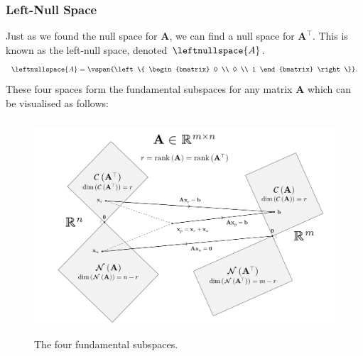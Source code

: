 \documentclass{article}
\begin{document}
\subsubsection{Left-Null Space}
Just as we found the null space for \(\symbf{A}\), we can find a null
space for \(\symbf{A}^\top\). This is known as the left-null space,
denoted \(\leftnullspace{A}\).
\begin{equation*}
    \leftnullspace{A} =
    \vspan{\left\{
        \begin{bmatrix}
            0 \\
            0 \\
            1
        \end{bmatrix}
        \right\}}.
\end{equation*}
These four spaces form the fundamental subspaces for any matrix \(\symbf{A}\)
which can be visualised as follows:
\begin{figure}[H]
    \centering
    \includegraphics[height = 8cm, keepaspectratio = true]{figures/fundamental_subspaces.pdf}
    \caption{The four fundamental subspaces.} %
\end{figure}
\end{document}
